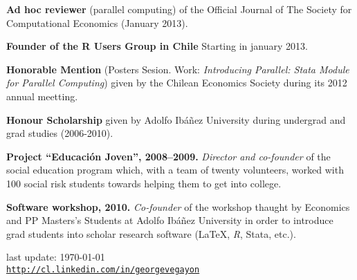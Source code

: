 \documentclass[letterpaper, 12pt]{article}
\def\footerlink{http://cl.linkedin.com/in/georgevegayon}
\renewenvironment{itemize}{
  \begin{list}{}{
    \setlength{\leftmargin}{0.45cm}
  }
}{
  \end{list}
}
\begin{document}
\begin{itemize}
\item \textbf{Ad hoc reviewer} (parallel computing) of the Official Journal of The Society for Computational Economics (January 2013).
\item \textbf{Founder of the R Users Group in Chile} Starting in january 2013.
\item \textbf{Honorable Mention} (Posters Sesion. Work: \emph{Introducing Parallel: Stata Module for Parallel Computing}) given by the Chilean Economics Society during its 2012 annual meetting.
\item \textbf{Honour Scholarship} given by Adolfo Ib\'a\~nez University during undergrad and grad studies (2006-2010).
\item \textbf{Project ``Educación Joven'', 2008--2009.} \emph{Director and co-founder} of the social education program
 which, with a team of twenty volunteers, worked with 100 social risk students towards helping them to get into college.
\item \textbf{Software workshop, 2010.} \emph{Co-founder} of the workshop thaught by Economics and PP Masters's Students at Adolfo Ib\'a\~nez University in order to introduce grad students into scholar research software (\LaTeX, \emph{R}, Stata, etc.).
\end{itemize}

\bigskip

\begin{center}
  \begin{footnotesize}
    last update: \today \\
    \href{\footerlink}{\texttt{\footerlink}}
  \end{footnotesize}
\end{center}
\end{document}

